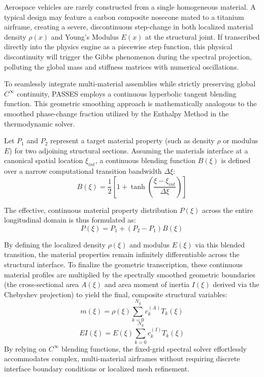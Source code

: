 \documentclass[11pt,a4paper]{article}
\theoremstyle{definition}
\numberwithin{equation}{section}
\begin{document}
\begin{appendices}
Aerospace vehicles are rarely constructed from a single homogeneous material. A typical design may feature a carbon composite nosecone mated to a titanium airframe, creating a severe, discontinuous step-change in both localized material density $\rho(x)$ and Young's Modulus $E(x)$ at the structural joint. If transcribed directly into the physics engine as a piecewise step function, this physical discontinuity will trigger the Gibbs phenomenon during the spectral projection, polluting the global mass and stiffness matrices with numerical oscillations.

To seamlessly integrate multi-material assemblies while strictly preserving global $C^\infty$ continuity, PASSES employs a continuous hyperbolic tangent blending function. This geometric smoothing approach is mathematically analogous to the smoothed phase-change fraction utilized by the Enthalpy Method in the thermodynamic solver.

Let $P_1$ and $P_2$ represent a target material property (such as density $\rho$ or modulus $E$) for two adjoining structural sections. Assuming the materials interface at a canonical spatial location $\xi_{int}$, a continuous blending function $B(\xi)$ is defined over a narrow computational transition bandwidth $\Delta \xi$:
\begin{equation}
    B(\xi) = \frac{1}{2} \left[ 1 + \tanh\left(\frac{\xi - \xi_{int}}{\Delta \xi}\right) \right]
\end{equation}

The effective, continuous material property distribution $P(\xi)$ across the entire longitudinal domain is thus formulated as:
\begin{equation}
    P(\xi) = P_1 + (P_2 - P_1) B(\xi)
\end{equation}

By defining the localized density $\rho(\xi)$ and modulus $E(\xi)$ via this blended transition, the material properties remain infinitely differentiable across the structural interface. To finalize the geometric transcription, these continuous material profiles are multiplied by the spectrally smoothed geometric boundaries (the cross-sectional area $A(\xi)$ and area moment of inertia $I(\xi)$ derived via the Chebyshev projection) to yield the final, composite structural variables:
\begin{equation}
    m(\xi) = \rho(\xi) \sum_{k=0}^{N_g} c_k^{(A)} T_k(\xi)
\end{equation}
\begin{equation}
    EI(\xi) = E(\xi) \sum_{k=0}^{N_g} c_k^{(I)} T_k(\xi)
\end{equation}
By relying on $C^\infty$ blending functions, the fixed-grid spectral solver effortlessly accommodates complex, multi-material airframes without requiring discrete interface boundary conditions or localized mesh refinement.


\end{appendices}
\end{document}
